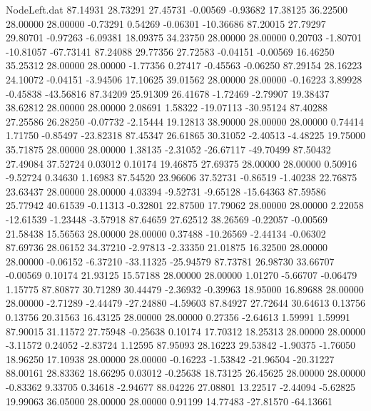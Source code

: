 \begin{filecontents}{NodeLeft.dat}
  87.14931   28.73291   27.45731    -0.00569   -0.93682   17.38125   36.22500   28.00000   28.00000   -0.73291    0.54269   -0.06301  -10.36686
  87.20015   27.79297   29.80701    -0.97263   -6.09381   18.09375   34.23750   28.00000   28.00000    0.20703   -1.80701  -10.81057  -67.73141
  87.24088   29.77356   27.72583    -0.04151   -0.00569   16.46250   35.25312   28.00000   28.00000   -1.77356    0.27417   -0.45563   -0.06250
  87.29154   28.16223   24.10072    -0.04151   -3.94506   17.10625   39.01562   28.00000   28.00000   -0.16223    3.89928   -0.45838  -43.56816
  87.34209   25.91309   26.41678    -1.72469   -2.79907   19.38437   38.62812   28.00000   28.00000    2.08691    1.58322  -19.07113  -30.95124
  87.40288   27.25586   26.28250    -0.07732   -2.15444   19.12813   38.90000   28.00000   28.00000    0.74414    1.71750   -0.85497  -23.82318
  87.45347   26.61865   30.31052    -2.40513   -4.48225   19.75000   35.71875   28.00000   28.00000    1.38135   -2.31052  -26.67117  -49.70499
  87.50432   27.49084   37.52724     0.03012    0.10174   19.46875   27.69375   28.00000   28.00000    0.50916   -9.52724    0.34630    1.16983
  87.54520   23.96606   37.52731    -0.86519   -1.40238   22.76875   23.63437   28.00000   28.00000    4.03394   -9.52731   -9.65128  -15.64363
  87.59586   25.77942   40.61539    -0.11313   -0.32801   22.87500   17.79062   28.00000   28.00000    2.22058  -12.61539   -1.23448   -3.57918
  87.64659   27.62512   38.26569    -0.22057   -0.00569   21.58438   15.56563   28.00000   28.00000    0.37488  -10.26569   -2.44134   -0.06302
  87.69736   28.06152   34.37210    -2.97813   -2.33350   21.01875   16.32500   28.00000   28.00000   -0.06152   -6.37210  -33.11325  -25.94579
  87.73781   26.98730   33.66707    -0.00569    0.10174   21.93125   15.57188   28.00000   28.00000    1.01270   -5.66707   -0.06479    1.15775
  87.80877   30.71289   30.44479    -2.36932   -0.39963   18.95000   16.89688   28.00000   28.00000   -2.71289   -2.44479  -27.24880   -4.59603
  87.84927   27.72644   30.64613     0.13756    0.13756   20.31563   16.43125   28.00000   28.00000    0.27356   -2.64613    1.59991    1.59991
  87.90015   31.11572   27.75948    -0.25638    0.10174   17.70312   18.25313   28.00000   28.00000   -3.11572    0.24052   -2.83724    1.12595
  87.95093   28.16223   29.53842    -1.90375   -1.76050   18.96250   17.10938   28.00000   28.00000   -0.16223   -1.53842  -21.96504  -20.31227
  88.00161   28.83362   18.66295     0.03012   -0.25638   18.73125   26.45625   28.00000   28.00000   -0.83362    9.33705    0.34618   -2.94677
  88.04226   27.08801   13.22517    -2.44094   -5.62825   19.99063   36.05000   28.00000   28.00000    0.91199   14.77483  -27.81570  -64.13661

\end{filecontents}
